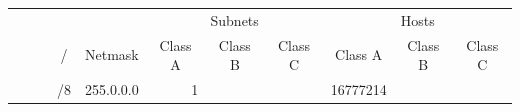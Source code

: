 \documentclass[11pt,a4paper]{article}
\begin{document}
\begin{table}[p]
\centering
{}
\begin{tabular}{cc|c|c|l|r|r|r|r|r|r|} 
\hhline{~~~~~------|}
                                                                                                                                        & \multicolumn{1}{c}{}                                                             & \multicolumn{1}{c}{}                                                        & \multicolumn{1}{c}{}                    &                                                               & \multicolumn{3}{c|}{{\cellcolor[rgb]{0.91,0.91,0.91}}Subnets}                                                                                                                                 & \multicolumn{3}{c|}{{\cellcolor[rgb]{0.91,0.91,0.91}}Hosts}                                                                                                                                    \\ 
\hhline{~~~--------|}
                                                                                                                                        & \multicolumn{1}{c}{}                                                             &                                                                             & {\cellcolor[rgb]{0.91,0.91,0.91}}/      & \multicolumn{1}{c|}{{\cellcolor[rgb]{0.91,0.91,0.91}}Netmask} & \multicolumn{1}{c|}{{\cellcolor[rgb]{0.91,0.91,0.91}}Class A} & \multicolumn{1}{c|}{{\cellcolor[rgb]{0.91,0.91,0.91}}Class B} & \multicolumn{1}{c|}{{\cellcolor[rgb]{0.91,0.91,0.91}}Class C} & \multicolumn{1}{c|}{{\cellcolor[rgb]{0.91,0.91,0.91}}Class A} & \multicolumn{1}{c|}{{\cellcolor[rgb]{0.91,0.91,0.91}}Class B} & \multicolumn{1}{c|}{{\cellcolor[rgb]{0.91,0.91,0.91}}Class C}  \\ 
\hhline{~~---------|}
                                                                                                                                        &                                                                                  & {\cellcolor[rgb]{1,0.89,0.827}}                                             & {\cellcolor[rgb]{1,0.89,0.827}}/8       & {\cellcolor[rgb]{1,0.89,0.827}}255.0.0.0                      & {\cellcolor[rgb]{1,0.89,0.827}}1                              &                                                               &                                                               & {\cellcolor[rgb]{1,0.89,0.827}}16777214                       &                                                               &                                                                \\ 

\end{tabular}
\end{table}
\end{document}
